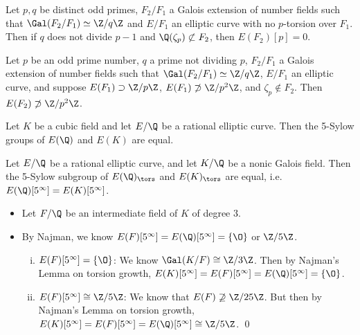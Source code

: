 \begin{frame}[plain]
\begin{lem}[Najman, 2015]
Let $p, q$ be distinct odd primes, $F_2/F_1$ a Galois extension of number fields such that $\Gal(F_2/F_1) \simeq \Z/q\Z$ and $E/F_1$ an elliptic curve with no $p$-torsion over $F_1$. Then if $q$ does not divide $p-1$ and $\Q(\zeta_p) \not\subset F_2$, then $E(F_2)[p]=0$. 
\end{lem}


\begin{lem}[Najman, 2015]
Let $p$ be an odd prime number, $q$ a prime not dividing $p$, $F_2/F_1$ a Galois extension of number fields such that $\Gal(F_2/F_1) \simeq \Z/q\Z$, $E/F_1$ an elliptic curve, and suppose $E(F_1) \supset \Z/p\Z$, $E(F_1) \not\supset \Z/p^2\Z$, and $\zeta_p \notin F_2$. Then $E(F_2) \not\supset \Z/p^2\Z$.
\end{lem} 
\end{frame}





\begin{frame}[plain]
\footnotesize
\begin{lem}[Najman, 2015]
Let $K$ be a cubic field and let $E/\Q$ be a rational elliptic curve. Then the 5-Sylow groups of $E(\Q)$ and $E(K)$ are equal. 
\end{lem}

\begin{lem}
Let $E/\Q$ be a rational elliptic curve, and let $K/\Q$ be a nonic Galois field. Then the 5-Sylow subgroup of $E(\Q)_\tors$ and $E(K)_\tors$ are equal, i.e. $E(\Q)[5^\infty]= E(K)[5^\infty]$.
\end{lem}

\pf 
\begin{itemize} 
\item Let $F/\Q$ be an intermediate field of $K$ of degree 3. 
\item By Najman, we know $E(F)[5^\infty]= E(\Q)[5^\infty]= \{ \O \}$ or $\Z/5\Z$.
	\begin{enumerate}[(i)] \footnotesize
	\item $E(F)[5^\infty]= \{ \O \}$: We know $\Gal(K/F) \cong \Z/3\Z$. Then by Najman's Lemma on torsion growth, $E(K)[5^\infty]= E(F)[5^\infty]= E(\Q)[5^\infty]= \{ \O \}$. \par\vspace{0.2cm}
	\item $E(F)[5^\infty] \cong \Z/5\Z$: We know that $E(F) \not\supseteq \Z/25\Z$. But then by Najman's Lemma on torsion growth, $E(K)[5^\infty]= E(F)[5^\infty]= E(\Q)[5^\infty] \cong \Z/5\Z$. \hfill\qed
	\end{enumerate}
\end{itemize}
\end{frame}






